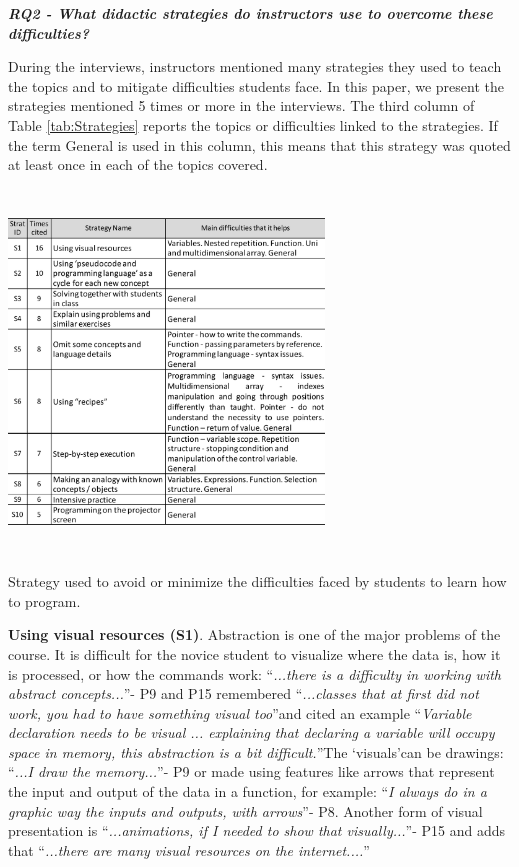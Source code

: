 \documentclass[sigconf]{acmart}
\begin{document}
\textbf { \textit{RQ2 - What didactic strategies do instructors use to overcome these difficulties?}}

During the interviews, instructors mentioned many strategies they used to teach the topics and to mitigate difficulties students face. In this paper, we present the strategies mentioned 5 times or more in the interviews. The third column of Table \ref{tab:Strategies} reports the topics or difficulties linked to the strategies. If the term General is used in this column, this means that this strategy was quoted at least once in each of the topics covered.

\begin{table}
\includegraphics[height=3.8in, width=3.3in]{Strategies1}
  \caption{Strategy used to avoid or minimize the difficulties faced by students to learn how to program.}
  \label{tab:Strategies}
\end{table}

\textbf{Using visual resources (S1)}. Abstraction is one of the major problems of the course. It is difficult for the novice student to visualize where the data is, how it is processed, or how the commands work: \textquotedblleft \textit{...there is a difficulty in working with abstract concepts...}\textquotedblright \space - P9 and P15 remembered \textquotedblleft \textit{...classes that at first did not work, you had to have something visual too}\textquotedblright \space and cited an example \textquotedblleft \textit{Variable declaration needs to be visual ... explaining that declaring a variable will occupy space in memory, this abstraction is a bit difficult.}\textquotedblright \space The \textquoteleft{visuals}\textquoteright can be drawings: \textquotedblleft \textit{...I draw the memory...}\textquotedblright \space - P9 or made using features like arrows that represent the input and output of the data in a function, for example: \textquotedblleft \textit{I always do in a graphic way the inputs and outputs, with arrows}\textquotedblright \space - P8. Another form of visual presentation is \textquotedblleft \textit{...animations, if I needed to show that visually...}\textquotedblright \space - P15 and adds that \textquotedblleft \textit{...there are many visual resources on the internet....}\textquotedblright
\end{document}
